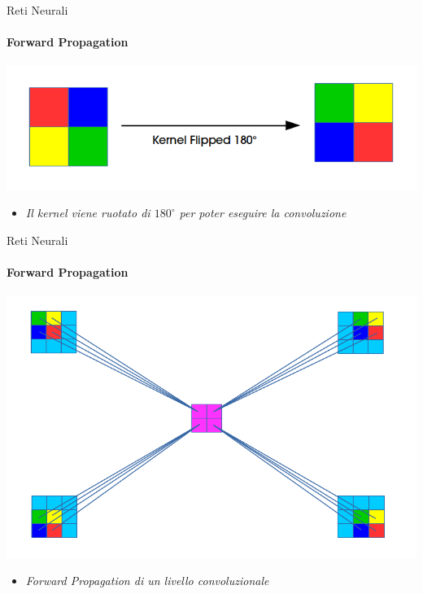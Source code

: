 \documentclass[
 ]{beamer}
\begin{document}
\begin{frame}{Reti Neurali}
    \framesubtitle{Forward Propagation} 
    
    \bigskip
    
    \begin{center}
      \includegraphics[scale = 0.4]{forward_flipped.png}
    \end{center}
  
    \bigskip \smallskip
        
    \begin{itemize}
        \setlength\itemsep{1em}
        \item[] \large \emph{Il kernel viene ruotato di $180^\circ$ per poter eseguire la convoluzione}
    \end{itemize}
\end{frame}

\begin{frame}{Reti Neurali}
    \framesubtitle{Forward Propagation} 
    
    \begin{center}
      \includegraphics[scale = 0.35]{forward_conv2.png}
    \end{center}
        
    \begin{itemize}
        \setlength\itemsep{1em}
        \item[] \large \emph{Forward Propagation di un livello convoluzionale}
    \end{itemize}
\end{frame}
\end{document}
